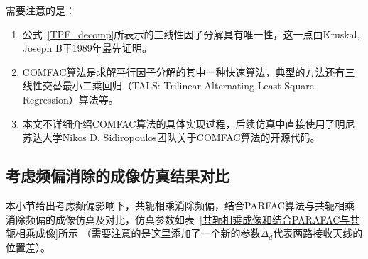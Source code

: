 需要注意的是：
\begin{enumerate}
  \item 公式~\eqref{TPF_decomp}所表示的三线性因子分解具有唯一性，这一点由Kruskal, Joseph B于1989年最先证明\cite{kruskal1989rank}。
  \item COMFAC算法是求解平行因子分解的其中一种快速算法，典型的方法还有三线性交替最小二乘回归（TALS: Trilinear Alternating Least Square Regression）算法等\cite{TPF}。
  \item 本文不详细介绍COMFAC算法的具体实现过程，后续仿真中直接使用了明尼苏达大学Nikos D. Sidiropoulos团队关于COMFAC算法的开源代码\cite{COMFAC_matlab}。
\end{enumerate}

\subsection{考虑频偏消除的成像仿真结果对比}
本小节给出考虑频偏影响下，共轭相乘消除频偏，结合PARFAC算法与共轭相乘消除频偏的成像仿真及对比，仿真参数如表~\ref{共轭相乘成像和结合PARAFAC与共轭相乘成像}所示
（需要注意的是这里添加了一个新的参数$\Delta_d$代表两路接收天线的位置差）。
